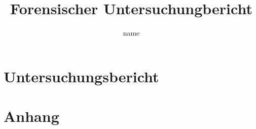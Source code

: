\documentclass{report}
\title{Forensischer Untersuchungbericht}
\author{name}
\begin{document}
\maketitle
\newpage
\tableofcontents
\newpage

\part{Untersuchungsbericht}




\part{Anhang}







\end{document}
